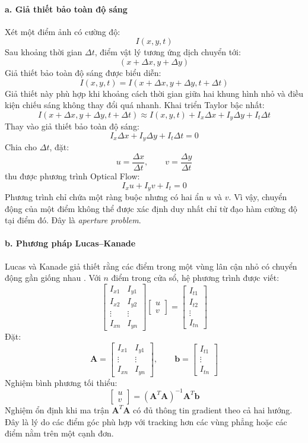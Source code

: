\documentclass[../DoAn.tex]{subfiles}
\begin{document}
\paragraph{a. Giả thiết bảo toàn độ sáng}
Xét một điểm ảnh có cường độ:
\[
I(x, y, t)
\]
Sau khoảng thời gian $\Delta t$, điểm vật lý tương ứng dịch chuyển tới:
\[
(x+\Delta x, y+\Delta y)
\]
Giả thiết bảo toàn độ sáng được biểu diễn:
\[
I(x, y, t) = I(x+\Delta x, y+\Delta y, t+\Delta t)
\]
Giả thiết này phù hợp khi khoảng cách thời gian giữa hai khung hình nhỏ và điều kiện chiếu sáng không thay đổi quá nhanh. Khai triển Taylor bậc nhất:
\[
I(x+\Delta x, y+\Delta y, t+\Delta t) \approx I(x, y, t) + I_x\Delta x + I_y\Delta y + I_t\Delta t
\]
Thay vào giả thiết bảo toàn độ sáng:
\[
I_x\Delta x + I_y\Delta y + I_t\Delta t = 0
\]
Chia cho $\Delta t$, đặt:
\[
u = \frac{\Delta x}{\Delta t}, \qquad v = \frac{\Delta y}{\Delta t}
\]
thu được phương trình Optical Flow:
\[
I_x u + I_y v + I_t = 0
\]
Phương trình chỉ chứa một ràng buộc nhưng có hai ẩn $u$ và $v$. Vì vậy, chuyển động của một điểm không thể được xác định duy nhất chỉ từ đạo hàm cường độ tại điểm đó. Đây là \textit{aperture problem}.

\paragraph{b. Phương pháp Lucas--Kanade}
Lucas và Kanade giả thiết rằng các điểm trong một vùng lân cận nhỏ có chuyển động gần giống nhau \cite{lucas_kanade1981}. Với $n$ điểm trong cửa sổ, hệ phương trình được viết:
\[
\begin{bmatrix}
I_{x1} & I_{y1} \\
I_{x2} & I_{y2} \\
\vdots & \vdots \\
I_{xn} & I_{yn}
\end{bmatrix}
\begin{bmatrix}
u \\ v
\end{bmatrix}
=
\begin{bmatrix}
I_{t1} \\
I_{t2} \\
\vdots \\
I_{tn}
\end{bmatrix}
\]
Đặt:
\[
\boldsymbol{A} = 
\begin{bmatrix}
I_{x1} & I_{y1} \\
\vdots & \vdots \\
I_{xn} & I_{yn}
\end{bmatrix},
\qquad
\mathbf{b} = 
\begin{bmatrix}
I_{t1} \\
\vdots \\
I_{tn}
\end{bmatrix}
\]
Nghiệm bình phương tối thiểu:
\[
\begin{bmatrix}
u \\ v
\end{bmatrix}
= \left(\boldsymbol{A}^{T}\boldsymbol{A}\right)^{-1}\boldsymbol{A}^{T}\mathbf{b}
\]
Nghiệm ổn định khi ma trận $\boldsymbol{A}^{T}\boldsymbol{A}$ có đủ thông tin gradient theo cả hai hướng. Đây là lý do các điểm góc phù hợp với tracking hơn các vùng phẳng hoặc các điểm nằm trên một cạnh đơn.
\end{document}
